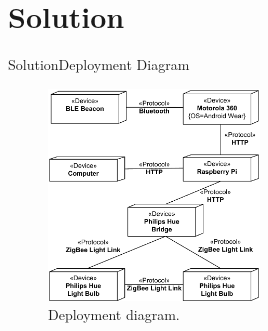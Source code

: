 \section{Solution}
\begin{frame}{Solution}{Deployment Diagram}
\begin{figure}[h]
\centering
\includegraphics[width=0.5\textwidth]{../images/deployment-diagram-simple}
\caption{Deployment diagram.}
\end{figure}
\end{frame}

